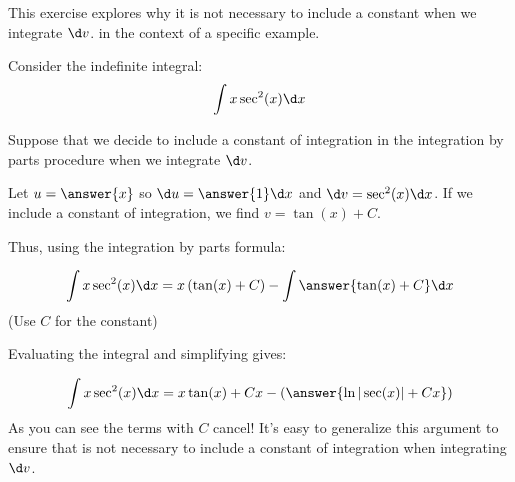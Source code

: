 \documentclass{ximera}
\author{Jim Talamo}
\begin{document}
\begin{exercise}
This exercise explores why it is not necessary to include a constant when we integrate $\d v$. in the context of a specific example.

Consider the indefinite integral:
\[
\int x \sec^2(x) \d x 
\]

Suppose that we decide to include a constant of integration in the integration by parts procedure when we integrate $\d v$.

Let $u=\answer{x}$ so $\d u =\answer{1} \d x$ and $\d v = \sec^2(x) \d x$.  If we include a constant of integration, we find $v = \tan(x)+C$.

Thus, using the integration by parts formula:

\[
\int x \sec^2(x) \d x = x \left( \tan(x) +C \right) - \int \answer{\tan(x) +C} \d x
\]
(Use $C$ for the constant)

\begin{exercise}

Evaluating the integral and simplifying gives:

\[
\int x \sec^2(x) \d x = x \tan(x) +Cx - \left(\answer{\ln|\sec(x)| + Cx}\right) %
\]
As you can see the terms with $C$ cancel!  It's easy to generalize this argument to ensure that is not necessary to include a constant of integration when integrating $\d v$.

\end{exercise}
\end{exercise}
\end{document}
